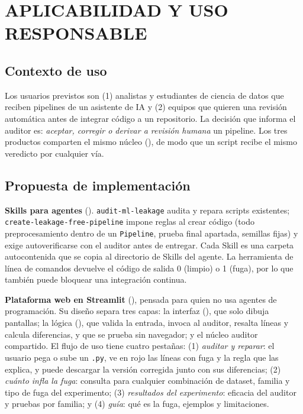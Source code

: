 
\chapter{APLICABILIDAD Y USO RESPONSABLE}
\label{ch:aplicabilidad}

\section{Contexto de uso}

Los usuarios previstos son (1) analistas y estudiantes de ciencia de datos que reciben pipelines de un asistente de IA y (2) equipos que quieren una revisión automática antes de integrar código a un repositorio. La decisión que informa el auditor es: \emph{aceptar, corregir o derivar a revisión humana} un pipeline. Los tres productos comparten el mismo núcleo (), de modo que un script recibe el mismo veredicto por cualquier vía.

\section{Propuesta de implementación}

\textbf{Skills para agentes} (). \texttt{audit-ml-leakage} audita y repara scripts existentes; \texttt{create-\allowbreak leakage-\allowbreak free-\allowbreak pipeline} impone reglas al crear código (todo preprocesamiento dentro de un \texttt{Pipeline}, prueba final apartada, semillas fijas) y exige autoverificarse con el auditor antes de entregar. Cada Skill es una carpeta autocontenida que se copia al directorio de Skills del agente. La herramienta de línea de comandos devuelve el código de salida 0 (limpio) o 1 (fuga), por lo que también puede bloquear una integración continua.

\textbf{Plataforma web en Streamlit} (), pensada para quien no usa agentes de programación. Su diseño separa tres capas: la interfaz (), que solo dibuja pantallas; la lógica (), que valida la entrada, invoca al auditor, resalta líneas y calcula diferencias, y que se prueba sin navegador; y el núcleo auditor compartido. El flujo de uso tiene cuatro pestañas: (1) \emph{auditar y reparar}: el usuario pega o sube un \texttt{.py}, ve en rojo las líneas con fuga y la regla que las explica, y puede descargar la versión corregida junto con sus diferencias; (2) \emph{cuánto infla la fuga}: consulta \DOpt{} para cualquier combinación de dataset, familia y tipo de fuga del experimento; (3) \emph{resultados del experimento}: eficacia del auditor y pruebas por familia; y (4) \emph{guía}: qué es la fuga, ejemplos y limitaciones.

